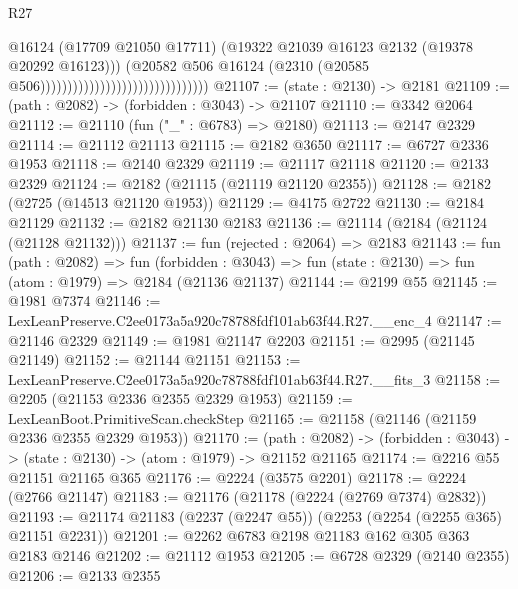 \begin{lexlean}{R27}
\begin{coremodule}
                                                              @16124
                                                              (@17709 @21050 @17711)
                                                              (@19322
                                                                @21039
                                                                @16123
                                                                @2132
                                                                (@19378 @20292 @16123)))
                                                            (@20582
                                                              @506
                                                              @16124
                                                              (@2310
                                                                (@20585
                                                                  @506)))))))))))))))))))))))))))))))
@21107 := (state : @2130) -> @2181
@21109 := (path : @2082) -> (forbidden : @3043) -> @21107
@21110 := @3342 @2064
@21112 := @21110 (fun ("_" : @6783) => @2180)
@21113 := @2147 @2329
@21114 := @21112 @21113
@21115 := @2182 @3650
@21117 := @6727 @2336 @1953
@21118 := @2140 @2329
@21119 := @21117 @21118
@21120 := @2133 @2329
@21124 := @2182 (@21115 (@21119 @21120 @2355))
@21128 := @2182 (@2725 (@14513 @21120 @1953))
@21129 := @4175 @2722
@21130 := @2184 @21129
@21132 := @2182 @21130 @2183
@21136 := @21114 (@2184 (@21124 (@21128 @21132)))
@21137 := fun (rejected : @2064) => @2183
@21143 := fun (path : @2082) =>
  fun (forbidden : @3043) => fun (state : @2130) => fun (atom : @1979) => @2184 (@21136 @21137)
@21144 := @2199 @55
@21145 := @1981 @7374
@21146 := LexLeanPreserve.C2ee0173a5a920c78788fdf101ab63f44.R27.__enc_4
@21147 := @21146 @2329
@21149 := @1981 @21147 @2203
@21151 := @2995 (@21145 @21149)
@21152 := @21144 @21151
@21153 := LexLeanPreserve.C2ee0173a5a920c78788fdf101ab63f44.R27.__fits_3
@21158 := @2205 (@21153 @2336 @2355 @2329 @1953)
@21159 := LexLeanBoot.PrimitiveScan.checkStep
@21165 := @21158 (@21146 (@21159 @2336 @2355 @2329 @1953))
@21170 := (path : @2082) ->
  (forbidden : @3043) -> (state : @2130) -> (atom : @1979) -> @21152 @21165
@21174 := @2216 @55 @21151 @21165 @365
@21176 := @2224 (@3575 @2201)
@21178 := @2224 (@2766 @21147)
@21183 := @21176 (@21178 (@2224 (@2769 @7374) @2832))
@21193 := @21174 @21183 (@2237 (@2247 @55)) (@2253 (@2254 (@2255 @365) @21151 @2231))
@21201 := @2262 @6783 @2198 @21183 @162 @305 @363 @2183 @2146
@21202 := @21112 @1953
@21205 := @6728 @2329 (@2140 @2355)
@21206 := @2133 @2355

\end{coremodule}
\end{lexlean}
